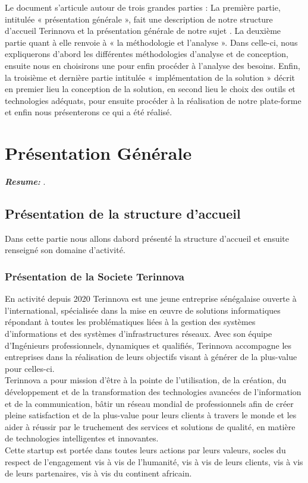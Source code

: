 \documentclass[a4paper, 12pt]{report}
\begin{document}
Le document s’articule autour de trois grandes parties :
La première partie, intitulée « présentation générale », fait une description de notre structure
d’accueil Terinnova et la présentation générale de notre sujet .
La deuxième partie quant à elle renvoie à « la méthodologie et l’analyse ». Dans celle-ci,
nous expliquerons d’abord les différentes méthodologies d’analyse et de conception, ensuite
nous en choisirons une pour enfin procéder à l’analyse des besoins.
Enfin, la troisième et dernière partie intitulée « implémentation de la solution » décrit en
premier lieu la conception de la solution, en second lieu le choix des outils et technologies
adéquats, pour ensuite procéder à la réalisation de notre plate-forme et enfin nous présenterons
ce qui a été réalisé.


\chapter{Présentation Générale}
\textit{\textbf{Resume:} }.
\setcounter{minitocdepth}{2}
\minitoc
\newpage
\section{Présentation de la structure d'accueil}
Dans cette partie nous allons dabord présenté la structure d'accueil et ensuite renseigné son domaine d'activité.
\subsection{Présentation de la Societe Terinnova}
  {En activité depuis 2020 Terinnova est une jeune entreprise sénégalaise ouverte à l’international, spécialisée dans la mise en œuvre de solutions informatiques répondant à toutes les problématiques liées à la gestion des systèmes d’informations et des systèmes d’infrastructures réseaux. Avec son équipe d’Ingénieurs professionnels, dynamiques et qualifiés, Terinnova accompagne les entreprises dans la réalisation de leurs objectifs visant à générer de la plus-value pour celles-ci. \\
  Terinnova a pour mission d’être à la pointe de l’utilisation, de la création, du développement et de la transformation des technologies avancées de l’information et de la communication, bâtir un réseau mondial de professionnels afin de créer pleine satisfaction et de la plus-value pour leurs clients à travers le monde et les aider à réussir par le truchement des services et solutions de qualité, en matière de technologies intelligentes et innovantes. 
  \\
  Cette startup est portée dans toutes leurs actions par leurs valeurs, socles du respect de l'engagement vis à vis de l’humanité, vis à vis de leurs clients, vis à vis de leurs partenaires, vis à vis du continent africain.}
\end{document}
